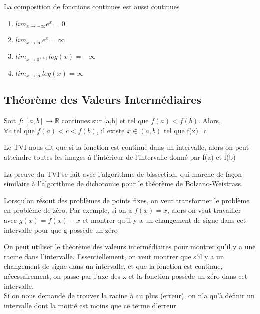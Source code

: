\documentclass{article}
\begin{document}
\begin{proposition}
    La composition de fonctions continues est aussi continues
\end{proposition}

\begin{proposition}
    \begin{enumerate}
	\item $lim_{x \to -\infty} e^x = 0$
	\item $lim_{x \to \infty} e^x = \infty$
	\item $lim_{x \to 0^(+)} log(x) = -\infty$
	\item $lim_{x \to \infty} log(x) = \infty$
    \end{enumerate}
\end{proposition}


\subsection{Théorème des Valeurs Intermédiaires}

\begin{theorem}
    Soit $f:[a,b] \to \mathbb{R}$ continues sur [a,b] et tel que
    $f(a)<f(b)$. Alors, $\forall c \text{ tel que } f(a)<c<f(b)$,
    il existe $x \in (a,b)$ tel que f(x)=c
\end{theorem}

\begin{intuition}
    Le TVI nous dit que si la fonction est continue dans un intervalle,
    alors on peut atteindre toutes les images à l'intérieur de l'intervalle
    donné par f(a) et f(b)
\end{intuition}

\begin{remark}
    La preuve du TVI se fait avec l'algorithme de bissection, qui marche
    de façon similaire à l'algorithme de dichotomie pour le théorème
    de Bolzano-Weistrass.
\end{remark}

\begin{problem}
    Lorsqu'on résout des problèmes de points fixes, on veut transformer
    le problème en problème de zéro. Par exemple, si on a $f(x)=x$, alors
    on veut travailler avec $g(x) = f(x)-x$ et montrer qu'il y a un
    changement de signe dans cet intervalle pour que g possède un zéro
\end{problem}

\begin{problem}
    On peut utiliser le théorème des valeurs intermédiaires pour montrer
    qu'il y a une racine dans l'intervalle. Essentiellement, on veut
    montrer que s'il y a un changement de signe dans un intervalle, et
    que la fonction est continue, nécessairement, on passe par l'axe
    des x et la fonction possède un zéro dans cet intervalle.\\
    Si on nous demande de trouver la racine à au plus (erreur), on n'a
    qu'à définir un intervalle dont la moitié est moins que ce terme
    d'erreur
\end{problem}
\end{document}
